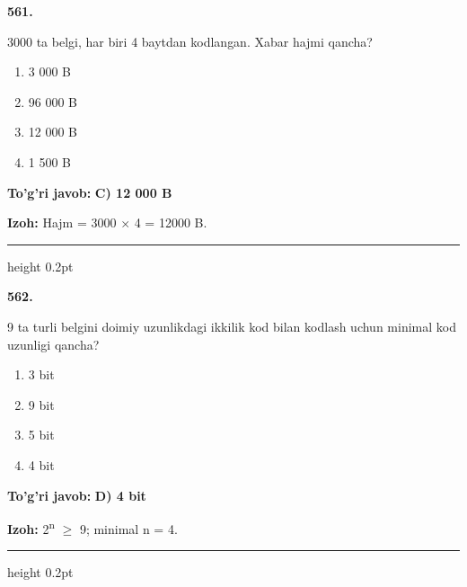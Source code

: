\documentclass[10pt,a4paper,oneside]{article}
\begin{document}
\noindent\textbf{\color{ink}561.}
\par
3000 ta belgi, har biri 4 baytdan kodlangan. Xabar hajmi qancha?
\begin{enumerate}[label=\Alph*),leftmargin=9mm]
\item 3 000 B
\item 96 000 B
\item 12 000 B
\item 1 500 B
\end{enumerate}
\begin{tcolorbox}[enhanced,breakable,colback=teal!4,colframe=teal!50!black,boxrule=0.5pt,arc=1.1mm,left=3mm,right=3mm,top=1.7mm,bottom=1.7mm,before skip=2mm,after skip=2mm]
\textbf{\color{teal}To'g'ri javob:} \textbf{C) 12 000 B}
\par\smallskip
\textbf{Izoh:} Hajm = 3000 \ensuremath{\times} 4 = 12000 B.
\end{tcolorbox}
\vspace{2mm}\hrule height 0.2pt \vspace{3mm}

\noindent\textbf{\color{ink}562.}
\par
9 ta turli belgini doimiy uzunlikdagi ikkilik kod bilan kodlash uchun minimal kod uzunligi qancha?
\begin{enumerate}[label=\Alph*),leftmargin=9mm]
\item 3 bit
\item 9 bit
\item 5 bit
\item 4 bit
\end{enumerate}
\begin{tcolorbox}[enhanced,breakable,colback=teal!4,colframe=teal!50!black,boxrule=0.5pt,arc=1.1mm,left=3mm,right=3mm,top=1.7mm,bottom=1.7mm,before skip=2mm,after skip=2mm]
\textbf{\color{teal}To'g'ri javob:} \textbf{D) 4 bit}
\par\smallskip
\textbf{Izoh:} 2\textsuperscript{n} \ensuremath{\geq} 9; minimal n = 4.
\end{tcolorbox}
\vspace{2mm}\hrule height 0.2pt \vspace{3mm}
\end{document}
